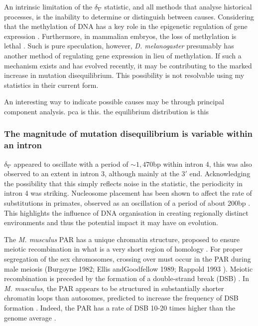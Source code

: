 An intrinsic limitation of the $\delta_\nabla$ statistic, and all methods that analyse historical processes, is the inability to determine or distinguish between causes. Considering that the methylation of DNA has a key role in the epigenetic regulation of gene expression \citep{Holliday1975DNADevelopment, Compere1981DNACells, Lieberman1983UltravioletDemethylation}. Furthermore, in mammalian embryos, the loss of methylation is lethal \citep{Panning1996DNAGenes}. Such is pure speculation, however, \textit{D. melanogaster} presumably has another method of regulating gene expression in lieu of methylation. If such a mechanism exists and has evolved recently, it may be contributing to the marked increase in mutation disequilibrium. This possibility is not resolvable using my statistics in their current form. 

An interesting way to indicate possible causes may be through principal component analysis. pca is this. the equilibrium distribution is this 

\subsubsection{The magnitude of mutation disequilibrium is variable within an intron}

$\delta_\nabla$ appeared to oscillate with a period of $\sim1,470$bp within intron 4, this was also observed to an extent in intron 3, although mainly at the $3'$ end. Acknowledging the possibility that this simply reflects noise in the statistic, the periodicity in intron 4 was striking. Nucleosome placement has been shown to affect the rate of substitutions in primates, observed as an oscillation of a period of about 200bp \citep{Ying2010EvidenceRepair}. This highlights the influence of DNA organisation in creating regionally distinct environments and thus the potential impact it may have on evolution. 

The \textit{M. musculus} PAR has a unique chromatin structure, proposed to ensure meiotic recombination in what is a very short region of homology \citep{Kauppi2011DistinctMeiosis}. For proper segregation of the sex chromosomes, crossing over must occur in the PAR during male meiosis (Burgoyne  1982;  Ellis  andGoodfellow 1989; Rappold 1993 \citep{Perry2001AMice}). Meiotic recombination is preceded by the formation of a double-strand break (DSB) \citep{Keeney2001MechanismInitiation}. In \textit{M. musculus}, the PAR appears to be structured in substantially shorter chromatin loops than autosomes, predicted to increase the frequency of DSB formation \citep{Kauppi2011DistinctMeiosis, Acquaviva2020EnsuringRegion}. Indeed, the PAR has a rate of DSB 10-20 times higher than the genome average \citep{Kauppi2011DistinctMeiosis}. 

